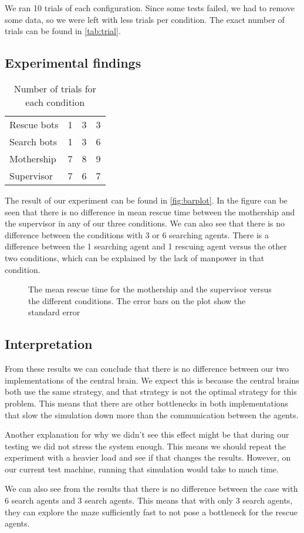 We ran 10 trials of each configuration. Since some tests failed, we had to
remove some data, so we were left with less trials per condition. The exact
number of trials can be found in \autoref{tab:trial}.

\subsection{Experimental findings}

\begin{table}
    \centering
    \caption{Number of trials for each condition}
    \label{tab:trial}
    \begin{tabular}{l|ccc}
        Rescue bots & 1 & 3 & 3 \\
        Search bots & 1 & 3 & 6 \\ \hline
        Mothership  & 7 & 8 & 9 \\
        Supervisor  & 7 & 6 & 7
    \end{tabular}
\end{table}

The result of our experiment can be found in \autoref{fig:barplot}. In the
figure can be seen that there is no difference in mean rescue time between
the mothership and the supervisor in any of our three conditions. We can
also see that there is no difference between the conditions with 3 or 6
searching agents. There is a difference between the 1 searching agent and 1
rescuing agent versus the other two conditions, which can be explained by
the lack of manpower in that condition. 

\begin{figure}
    \centering
    \resizebox{0.75\textwidth}{!}{
        }
    \caption{The mean rescue time for the mothership and the supervisor
        versus the different conditions. The error bars on the plot show
        the standard error}
    \label{fig:barplot}
\end{figure}

\subsection{Interpretation}
From these results we can conclude that there is no difference between our
two implementations of the central brain. We expect this is because the
central brains both use the same strategy, and that strategy is not the
optimal strategy for this problem. This means that there are other
bottlenecks in both implementations that slow the simulation down more
than the communication between the agents. 

Another explanation for why we didn't see this effect might be that during our
testing we did not stress the system enough. This means we should repeat
the experiment with a heavier load and see if that changes the results.
However, on our current test machine, running that simulation would take to
much time. 

We can also see from the results that there is no difference between the
case with 6 search agents and 3 search agents. This means that with only 3
search agents, they can explore the maze sufficiently fast to not pose a
bottleneck for the rescue agents.
